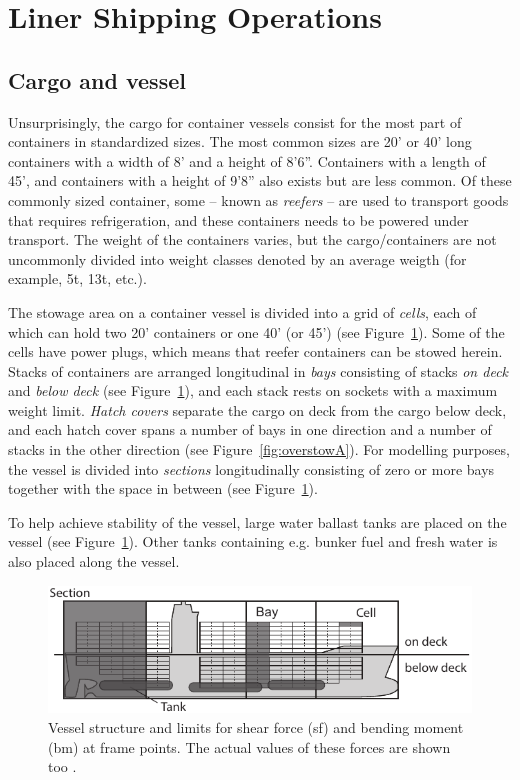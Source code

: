 \section{Liner Shipping Operations}
\subsection{Cargo and vessel}
Unsurprisingly, the cargo for container vessels consist for the most part of containers in standardized sizes. The most common sizes are 20' or 40' long containers with a width of 8' and a height of 8'6''. Containers with a length of 45', and containers with a height of 9'8'' also exists but are less common. Of these commonly sized container, some -- known as \emph{reefers} -- are used to transport goods that requires refrigeration, and these containers needs to be powered under transport.  The weight of the containers varies, but the cargo/containers are not uncommonly divided into weight classes denoted by an average weigth (for example, 5t, 13t, etc.).

The stowage area on a container vessel is divided into a grid of \emph{cells}, each of which can hold two 20' containers or one 40' (or 45') (see Figure~\ref{fig:vesselA}). Some of the cells have power plugs, which means that reefer containers can be stowed herein. 
Stacks of containers are arranged longitudinal in \emph{bays} consisting of stacks \emph{on deck} and \emph{below deck} (see Figure~\ref{fig:vesselA}), and each stack rests on sockets with a maximum weight limit. 
\emph{Hatch covers} separate the cargo on deck from the cargo below deck, and each hatch cover spans a number of bays in one direction and a number of stacks in the other direction (see Figure~\ref{fig:overstowA}).
For modelling purposes, the vessel is divided into \emph{sections} longitudinally consisting of zero or more bays together with the space in between (see Figure~\ref{fig:vesselA}). 

To help achieve stability of the vessel, large water ballast tanks are placed on the vessel (see Figure~\ref{fig:vesselA}). Other tanks containing e.g. bunker fuel and fresh water is also placed along the vessel.

\begin{figure}[pos=htbp]
	\centering
		\includegraphics{figures/vessel1.pdf} 
	\caption{Vessel structure and limits for shear force (sf) and bending moment (bm) at frame points. The actual values of these forces are shown too .}
	\label{fig:vesselA}
\end{figure}


